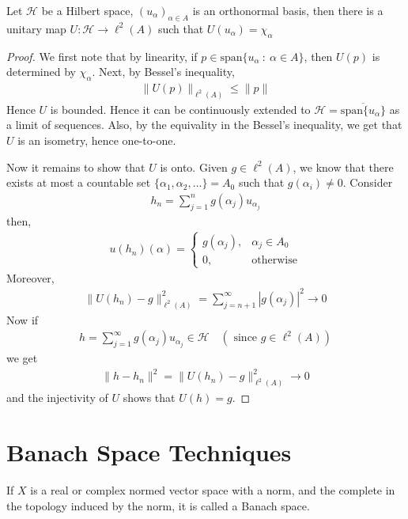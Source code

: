 \begin{theorem}
  Let $\mathcal{H}$ be a Hilbert space, $(u_\alpha)_{\alpha \in A}$
  is an orthonormal basis, then there is a unitary map $U:
  \mathcal{H} \to \ell^{2}(A)$ such that $U(u_\alpha) = \chi_\alpha$
\end{theorem}
\begin{proof}
  We first note that by linearity, if $p \in \textrm{span}\{ u_\alpha
  \ : \ \alpha \in A \}$, then $U(p)$ is determined by $\chi_\alpha$.
  Next, by Bessel's inequality,
  \begin{align*}
    \|U(p)\|_{\ell^{2}(A)} \le \|p\|
  \end{align*}
  Hence $U$ is bounded. Hence it can be continuously extended to
  $\mathcal{H} = \overline{\textrm{span} \{ u_\alpha \}}$ as a limit
  of sequences. Also, by the equivality in the Bessel's inequality,
  we get that $U$ is an isometry, hence one-to-one.

  Now it remains to show that $U$ is onto. Given $g \in \ell^{2}(A)$,
  we know that there exists at most a countable set $ \{ \alpha_1 ,
  \alpha_2 , \ldots \} = A_0$ such that $g(\alpha_i) \neq 0$. Consider
  \begin{align*}
    h_n = \sum_{j = 1}^{n} g(\alpha_j) u_{\alpha_j}
  \end{align*}
  then,
  \begin{align*}
    u(h_n)(\alpha) =
    \begin{cases}
      g(\alpha_j), & \alpha_j \in A_0 \\
      0, & \textrm{otherwise}
    \end{cases}
  \end{align*}
  Moreover,
  \begin{align*}
    \Big \| U(h_n) - g \Big \|_{\ell^{2}(A)}^2 = \sum_{j =
    n+1}^{\infty} |g(\alpha_j)|^2 \to 0
  \end{align*}
  Now if
  \begin{align*}
    h = \sum_{j = 1}^{\infty}  g(\alpha_j) u_{\alpha_j} \in
    \mathcal{H} \quad (\textrm{ since } g \in \ell^{2}(A))
  \end{align*}
  we get
  \begin{align*}
    \|h - h_n\|^2 = \|U(h_n) - g\|^2_{\ell^{2}(A)} \to 0
  \end{align*}
  and the injectivity of $U$ shows that $U(h) = g$.
\end{proof}

\chapter{Banach Space Techniques}
\begin{definition}
  If $X$ is a real or complex normed vector space with a norm, and
  the complete in the topology induced by the norm, it is called a Banach space.
\end{definition}

